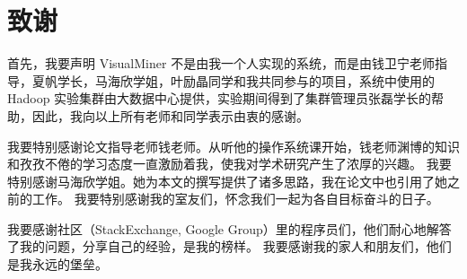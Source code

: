 \renewcommand{\chaptername}{}
\titleformat{\chapter}{\centering\hei\xiaosanhao}{\chaptername}{0pt}{}
\chapter*{致谢}
\thispagestyle{fancy}
首先，我要声明 VisualMiner 不是由我一个人实现的系统，而是由钱卫宁老师指导，夏帆学长，马海欣学姐，叶励晶同学和我共同参与的项目，系统中使用的 Hadoop 实验集群由大数据中心提供，实验期间得到了集群管理员张磊学长的帮助，因此，我向以上所有老师和同学表示由衷的感谢。

我要特别感谢论文指导老师钱老师。从听他的操作系统课开始，钱老师渊博的知识和孜孜不倦的学习态度一直激励着我，使我对学术研究产生了浓厚的兴趣。
我要特别感谢马海欣学姐。她为本文的撰写提供了诸多思路，我在论文中也引用了她之前的工作。
我要特别感谢我的室友们，怀念我们一起为各自目标奋斗的日子。

我要感谢社区（StackExchange, Google Group）里的程序员们，他们耐心地解答了我的问题，分享自己的经验，是我的榜样。
我要感谢我的家人和朋友们，他们是我永远的堡垒。
